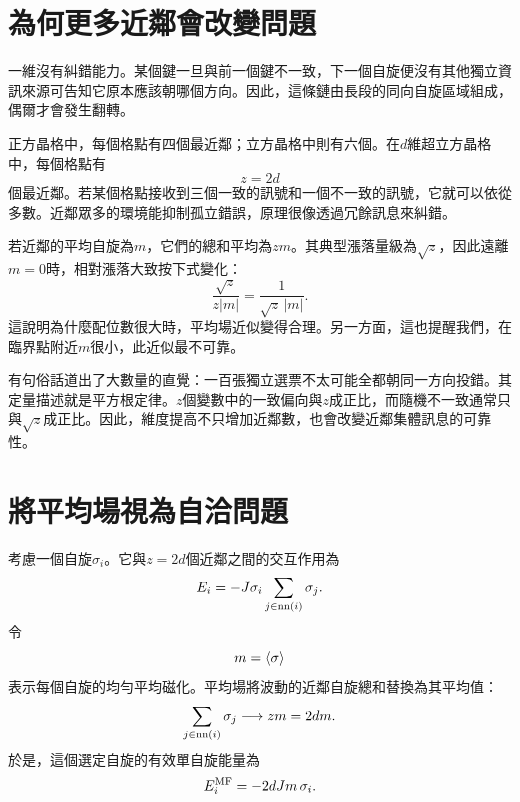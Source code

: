 \section{為何更多近鄰會改變問題}

一維沒有糾錯能力。某個鍵一旦與前一個鍵不一致，下一個自旋便沒有其他獨立資訊來源可告知它原本應該朝哪個方向。因此，這條鏈由長段的同向自旋區域組成，偶爾才會發生翻轉。

正方晶格中，每個格點有四個最近鄰；立方晶格中則有六個。在\(d\)維超立方晶格中，每個格點有
\begin{equation}
z=2d
\end{equation}
個最近鄰。若某個格點接收到三個一致的訊號和一個不一致的訊號，它就可以依從多數。近鄰眾多的環境能抑制孤立錯誤，原理很像透過冗餘訊息來糾錯。

若近鄰的平均自旋為\(m\)，它們的總和平均為\(zm\)。其典型漲落量級為\(\sqrt{z}\)，因此遠離\(m=0\)時，相對漲落大致按下式變化：
\begin{equation}
\frac{\sqrt{z}}{z|m|}
=\frac{1}{\sqrt{z}\,|m|}.
\end{equation}
這說明為什麼配位數很大時，平均場近似變得合理。另一方面，這也提醒我們，在臨界點附近\(m\)很小，此近似最不可靠。

有句俗話道出了大數量的直覺：一百張獨立選票不太可能全都朝同一方向投錯。其定量描述就是平方根定律。\(z\)個變數中的一致偏向與\(z\)成正比，而隨機不一致通常只與\(\sqrt{z}\)成正比。因此，維度提高不只增加近鄰數，也會改變近鄰集體訊息的可靠性。

\begin{classroomqa}
\end{classroomqa}

\section{將平均場視為自洽問題}

考慮一個自旋\(\sigma_i\)。它與\(z=2d\)個近鄰之間的交互作用為
\begin{equation}
E_i=-J\sigma_i\sum_{j\in{\rm nn}(i)}\sigma_j.
\label{eq:local-energy}
\end{equation}
令
\begin{equation}
m=\left\langle\sigma\right\rangle
\end{equation}
表示每個自旋的均勻平均磁化。平均場將波動的近鄰自旋總和替換為其平均值：
\begin{equation}
\sum_{j\in{\rm nn}(i)}\sigma_j
\longrightarrow zm=2dm.
\end{equation}
於是，這個選定自旋的有效單自旋能量為
\begin{equation}
E_i^{\rm MF}=-2dJm\,\sigma_i.
\label{eq:mean-field-energy}
\end{equation}

